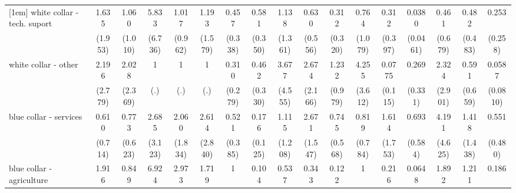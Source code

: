 {\begin{tabular}{l*{16}{c}}
[1em]
white collar - tech. suport&       1.635         &       1.060         &       5.833         &       1.017         &       1.193         &       0.457         &       0.581         &       1.138         &       0.630         &       0.312         &       0.764         &       0.312         &      0.0380\sym{**} &       0.461         &       0.482         &       0.253         \\
                    &     (1.953)         &     (1.010)         &     (6.736)         &     (0.962)         &     (1.579)         &     (0.338)         &     (0.350)         &     (1.361)         &     (0.556)         &     (0.320)         &     (1.079)         &     (0.397)         &    (0.0461)         &     (0.679)         &     (0.483)         &     (0.258)         \\
[1em]
white collar - other&       2.196         &       2.028         &           1         &           1         &           1         &       0.310         &       0.462         &       3.677         &       2.674         &       1.232         &       4.255         &      0.0775         &       0.269         &       2.324         &       0.591         &      0.0587\sym{*}  \\
                    &     (2.779)         &     (2.369)         &         (.)         &         (.)         &         (.)         &     (0.279)         &     (0.330)         &     (4.555)         &     (2.166)         &     (0.979)         &     (3.612)         &     (0.115)         &     (0.331)         &     (2.901)         &     (0.659)         &    (0.0810)         \\
[1em]
blue collar - services&       0.610         &       0.773         &       2.685         &       2.060         &       2.614         &       0.521         &       0.176\sym{*}  &       1.115         &       2.671         &       0.745         &       0.819         &       1.614         &       0.693         &       4.191         &       1.418         &       0.551         \\
                    &     (0.714)         &     (0.623)         &     (3.123)         &     (1.834)         &     (2.840)         &     (0.385)         &     (0.125)         &     (1.208)         &     (1.547)         &     (0.568)         &     (0.784)         &     (1.753)         &     (0.584)         &     (4.625)         &     (1.438)         &     (0.480)         \\
[1em]
blue collar - agriculture&       1.916         &       0.849         &       6.924         &       2.973         &       1.719         &           1         &       0.104\sym{*}  &       0.537         &       0.343         &       0.122         &           1         &       0.216         &      0.0648\sym{*}  &       1.892         &       1.211         &       0.186         \\

\end{tabular}}
